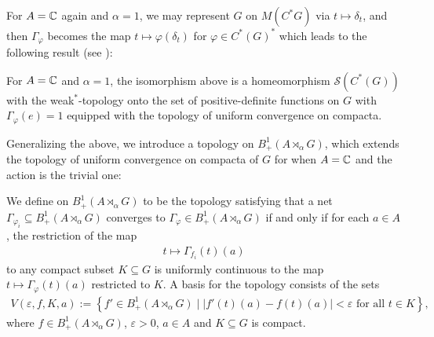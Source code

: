 For $A = \mathbb{C}$ again and $\alpha = 1$, we may represent $G$ on $M(C^*G)$ via $t \mapsto \delta_t$, and then $\Gamma_\varphi$ becomes the map $t \mapsto \varphi(\delta_t)$ for $ \varphi \in C^*(G)^*$ which leads to the following result (see \cite[7.1.11]{pedersenalgauto}):
\begin{proposition}
	For $A= \mathbb{C}$ and $\alpha = 1$, the isomorphism above is a homeomorphism $\mathcal{S}(C^*(G))$ with the weak$^*$-topology onto the set of positive-definite functions on $G$ with $\Gamma_\varphi(e)=1$ equipped with the topology of uniform convergence on compacta.
	\label{mult:OGstatehomeo}
\end{proposition}

Generalizing the above, we introduce a topology on $B_+^1(A \rtimes_\alpha G)$, which extends the topology of uniform convergence on compacta of $G$ for when $A = \mathbb{C}$ and the action is the trivial one:
\begin{definition}
	We define  on $B_+^1(A \rtimes_\alpha G)$ to be the topology satisfying that a net $\Gamma_{\varphi_i} \subseteq B_+^1(A \rtimes_\alpha G)$ converges to $\Gamma_{\varphi} \in B_+^1(A \rtimes_\alpha G)$ if and only if for each $a \in A$, the restriction of the map
	\begin{align*}
		t \mapsto \Gamma_{f_i}(t)(a)
	\end{align*}
	to any compact subset $K \subseteq G$ is uniformly continuous to the map $t \mapsto \Gamma_\varphi(t)(a)$ restricted to $K$. A basis for the topology consists of the sets
	\begin{align*}
		V(\varepsilon, f, K, a) :=\left\{ f' \in B_+^1(A \rtimes_\alpha G) \mid | f'(t)(a) - f(t)(a) | < \varepsilon \text{ for all } t \in K \right\},
	\end{align*}
	where $f \in B_{+}^1(A \rtimes_\alpha G)$, $\varepsilon > 0$, $a \in A$ and $K \subseteq G$ is compact.
\end{definition}

